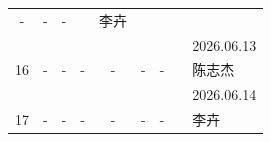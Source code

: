 \documentclass[UTF8,10pt,a4paper,fontset=fandol]{ctexart}
\newcommand{\fieldvalue}[1]{#1}
\newcommand{\handwritten}[1]{#1}
\begin{document}
\begin{center}
\begin{tabular}{|c|c|c|c|c|c|c|p{2.2cm}|p{2.8cm}|}
\fieldvalue{\handwritten{-}} &
\fieldvalue{\handwritten{-}} &
\fieldvalue{\handwritten{-}} &
&
\fieldvalue{\handwritten{李卉}}\\[-1mm]
&
&
&
&
&
&
&
&
\fieldvalue{\handwritten{2026.06.13}}\\
\hline
\fieldvalue{\handwritten{16}} &
\fieldvalue{\handwritten{-}} &
\fieldvalue{\handwritten{-}} &
\fieldvalue{\handwritten{-}} &
\fieldvalue{\handwritten{-}} &
\fieldvalue{\handwritten{-}} &
\fieldvalue{\handwritten{-}} &
&
\fieldvalue{\handwritten{陈志杰}}\\[-1mm]
&
&
&
&
&
&
&
&
\fieldvalue{\handwritten{2026.06.14}}\\
\hline
\fieldvalue{\handwritten{17}} &
\fieldvalue{\handwritten{-}} &
\fieldvalue{\handwritten{-}} &
\fieldvalue{\handwritten{-}} &
\fieldvalue{\handwritten{-}} &
\fieldvalue{\handwritten{-}} &
\fieldvalue{\handwritten{-}} &
&
\fieldvalue{\handwritten{李卉}}\\[-1mm]

\end{tabular}
\end{center}
\end{document}
